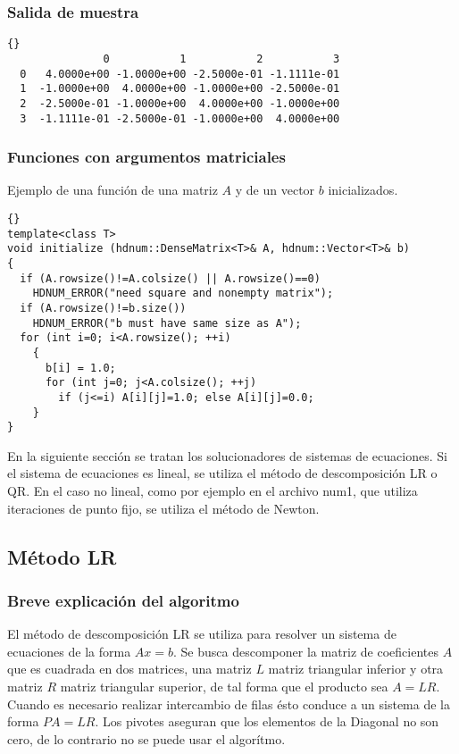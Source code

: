 \begin{frame}[fragile]
\frametitle{Salida de muestra}
{\footnotesize{\begin{lstlisting}{}
               0           1           2           3
  0   4.0000e+00 -1.0000e+00 -2.5000e-01 -1.1111e-01
  1  -1.0000e+00  4.0000e+00 -1.0000e+00 -2.5000e-01
  2  -2.5000e-01 -1.0000e+00  4.0000e+00 -1.0000e+00
  3  -1.1111e-01 -2.5000e-01 -1.0000e+00  4.0000e+00
\end{lstlisting}}}
\end{frame}

\begin{frame}[fragile]
\frametitle{Funciones con argumentos matriciales}
Ejemplo de una función de una matriz $A$ y de un vector  $b$
inicializados.

{\footnotesize{\begin{lstlisting}{}
template<class T>
void initialize (hdnum::DenseMatrix<T>& A, hdnum::Vector<T>& b)
{
  if (A.rowsize()!=A.colsize() || A.rowsize()==0)
    HDNUM_ERROR("need square and nonempty matrix");
  if (A.rowsize()!=b.size())
    HDNUM_ERROR("b must have same size as A");
  for (int i=0; i<A.rowsize(); ++i)
    {
      b[i] = 1.0;
      for (int j=0; j<A.colsize(); ++j)
        if (j<=i) A[i][j]=1.0; else A[i][j]=0.0;
    }
}
\end{lstlisting}}}
\end{frame}
En la siguiente sección se tratan los solucionadores de sistemas de ecuaciones.
Si el sistema de ecuaciones es lineal, se utiliza el método de descomposición LR 
o QR.  En el caso no lineal, como por ejemplo en el archivo num1, que utiliza 
iteraciones de punto fijo, se utiliza el método de Newton.

\subsection{Método LR}

\subsubsection{Breve explicación del algoritmo}
El método de descomposición LR se utiliza para resolver un sistema
de ecuaciones de la forma $Ax=b$. Se busca descomponer la matriz de coeficientes 
$A$ que es cuadrada en dos matrices, una matriz $L$ matriz triangular inferior y 
otra matriz $R$ matriz triangular superior, de tal forma que el producto sea
$A=LR$. Cuando es necesario realizar intercambio de filas ésto conduce a un 
sistema de la forma $PA = LR$.  Los pivotes aseguran que los elementos de la Diagonal 
no son cero, de lo contrario no se puede usar el algorítmo.

